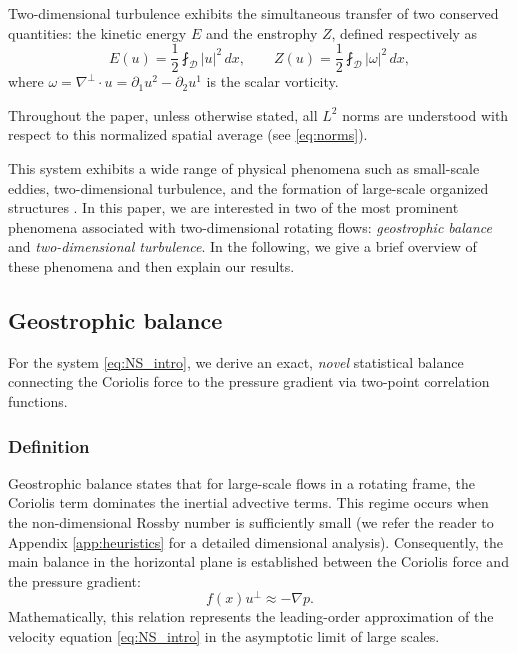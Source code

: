 \documentclass[11pt,a4paper]{article}
\numberwithin{equation}{section}
\numberwithin{theorem}{section}
\numberwithin{remark}{section}
\numberwithin{definition}{section}
\begin{document}
Two-dimensional turbulence exhibits the simultaneous transfer of two conserved quantities: the kinetic energy $E$ and the enstrophy $Z$, defined respectively as
\begin{equation}\label{eq:energy_enstrophy_def}
    E(u) = \frac{1}{2} \fint_{\mathcal{D}} |u|^2 \, dx, \qquad Z(u) = \frac{1}{2} \fint_{\mathcal{D}} |\omega|^2 \, dx,
\end{equation}
where $\omega = \nabla^\perp \cdot u = \partial_1 u^2 - \partial_2 u^1$ is the scalar vorticity.

Throughout the paper, unless otherwise stated, all $L^2$ norms are understood with respect to this normalized spatial average (see \eqref{eq:norms}).

This system exhibits a wide range of physical phenomena such as small-scale eddies, two-dimensional turbulence, and the formation of large-scale organized structures \cite{boffetta, pedlosky, vallis1}. In this paper, we are interested in two of the most prominent phenomena associated with two-dimensional rotating flows: \textit{geostrophic balance} and \textit{two-dimensional turbulence}. In the following, we give a brief overview of these phenomena and then explain our results.



\subsection{Geostrophic balance}
For the system \eqref{eq:NS_intro}, we derive an exact, \textit{novel} statistical balance connecting the Coriolis force to the pressure gradient via two-point correlation functions.

\subsubsection{Definition}
Geostrophic balance states that for large-scale flows in a rotating frame, the Coriolis term dominates the inertial advective terms. This regime occurs when the non-dimensional Rossby number is sufficiently small (we refer the reader to Appendix \ref{app:heuristics} for a detailed dimensional analysis). Consequently, the main balance in the horizontal plane is established between the Coriolis force and the pressure gradient: 
\begin{equation} \label{eq: Geo bal sch 1}
    f(x) u^{\perp} \approx -\nabla p.
\end{equation}
Mathematically, this relation represents the leading-order approximation of the velocity equation \eqref{eq:NS_intro} in the asymptotic limit of large scales.
\end{document}
